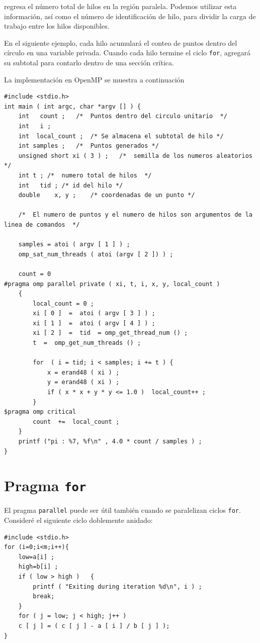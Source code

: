 \documentclass[12pt,letterpaper]{book}
\begin{document}
regresa el número total de hilos en la región paralela. Podemos utilizar esta información, así como el número de identificación de hilo, para dividir la carga de trabajo entre los hilos disponibles.

En el siguiente ejemplo, cada hilo acumulará el conteo de puntos dentro del círculo en una variable privada. Cuando cada hilo termine el ciclo \texttt{for}, agregará su subtotal para contarlo dentro de una sección crítica.

La implementación en OpenMP se muestra a continuación

\begin{lstlisting}[style=C]
#include <stdio.h>
int main ( int argc, char *argv [] ) {
	int	  count ;	/*  Puntos dentro del circulo unitario  */
	int	  i ;
	int	 local_count ;	/* Se almacena el subtotal de hilo */
	int samples ; 	/*  Puntos generados */
	unsigned short xi ( 3 ) ;	/*  semilla de los numeros aleatorios  */
	int t ;	/*  numero total de hilos  */
	int	  tid ;	/* id del hilo */
	double	  x, y ;	/* coordenadas de un punto */

	/*  El numero de puntos y el numero de hilos son argumentos de la linea de comandos  */

	samples = atoi ( argv [ 1 ] ) ;
	omp_sat_num_threads ( atoi (argv [ 2 ]) ) ;

	count = 0 
#pragma omp parallel private ( xi, t, i, x, y, local_count )
	{
		local_count = 0 ;
		xi [ 0 ]  =  atoi ( argv [ 3 ] ) ;
		xi [ 1 ]  =  atoi ( argv [ 4 ] ) ;
		xi [ 2 ]  =  tid  = omp_get_thread_num () ;
		t  =  omp_get_num_threads () ;

		for  ( i = tid; i < samples; i += t ) {
			x = erand48 ( xi ) ;
			y = erand48 ( xi ) ;
			if ( x * x + y * y <= 1.0 )  local_count++ ;
		}
$pragma omp critical
		count  +=  local_count ;
	}
	printf ("pi : %7, %f\n" , 4.0 * count / samples ) ;
}
\end{lstlisting}


\section{Pragma \texttt{for}}

El pragma \texttt{parallel} puede ser útil también cuando se paralelizan ciclos \texttt{for}. Consideré el siguiente ciclo doblemente anidado:

\begin{lstlisting}[style=C]
#include <stdio.h>
for (i=0;i<m;i++){
	low=a[i] ;
	high=b[i] ;
	if ( low > high )	{	
		printf ( "Exiting during iteration %d\n", i ) ;
		break;
	}
	for ( j = low; j < high; j++ )
	c [ j ] = ( c [ j ] - a [ i ] / b [ j ] );
}
\end{lstlisting}
\end{document}
